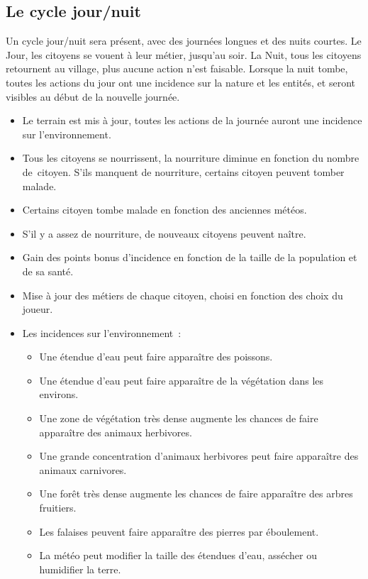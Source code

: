 \documentclass[a4paper]{article}
\begin{document}
\subsection*{Le cycle jour/nuit}
Un cycle jour/nuit sera présent, avec des journées longues et des nuits courtes. Le Jour, les citoyens se vouent à leur métier, jusqu'au soir. La Nuit, tous les citoyens retournent au village, plus aucune action n'est faisable. Lorsque la nuit tombe, toutes les actions du jour ont une incidence sur la nature et les entités, et seront visibles au début de la nouvelle journée.
\begin{itemize} \small
\item Le terrain est mis à jour, toutes les actions de la journée auront une incidence sur l'environnement.
\item Tous les citoyens se nourrissent, la nourriture diminue en fonction du nombre de citoyen. S'ils manquent de nourriture, certains citoyen peuvent tomber malade.
\item Certains citoyen tombe malade en fonction des anciennes météos.
\item S'il y a assez de nourriture, de nouveaux citoyens peuvent naître.
\item Gain des points bonus d'incidence en fonction de la taille de la population et de sa santé.
\item Mise à jour des métiers de chaque citoyen, choisi en fonction des choix du joueur.
\bigskip
\item Les incidences sur l'environnement :
  \begin{itemize}
    \item Une étendue d'eau peut faire apparaître des poissons.
    \item Une étendue d'eau peut faire apparaître de la végétation dans les environs.
    \item Une zone de végétation très dense augmente les chances de faire apparaître des animaux herbivores.
    \item Une grande concentration d'animaux herbivores peut faire apparaître des animaux carnivores.
    \item Une forêt très dense augmente les chances de faire apparaître des arbres fruitiers.
    \item Les falaises peuvent faire apparaître des pierres par éboulement.
    \item La météo peut modifier la taille des étendues d'eau, assécher ou humidifier la terre.
  \end{itemize}
\end{itemize} \normalsize
\end{document}
